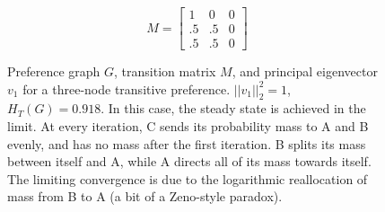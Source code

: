 \begin{figure}[!htb] %
\centering
\begin{minipage}{1.2in}
\end{minipage}
\hfill
\begin{minipage}{1.2in}
\[
M=
  \begin{bmatrix}
    1 & 0 & 0 \\
    .5 & .5 & 0 \\
    .5 & .5 & 0
  \end{bmatrix}
\]
\end{minipage}
\hfill
\begin{minipage}{1.2in}
\end{minipage}
\caption{Preference graph $G$, transition matrix $M$, and principal eigenvector $v_1$ for a three-node transitive preference. $||v_1||_2^2 = 1$, $H_T(G) = 0.918$. In this case, the steady state is achieved in the limit. At every iteration, C sends its probability mass to A and B evenly, and has no mass after the first iteration. B splits its mass between itself and A, while A directs all of its mass towards itself. The limiting convergence is due to the logarithmic reallocation of mass from B to A (a bit of a Zeno-style paradox).}
\label{fig:linalg_3} 
\end{figure}



